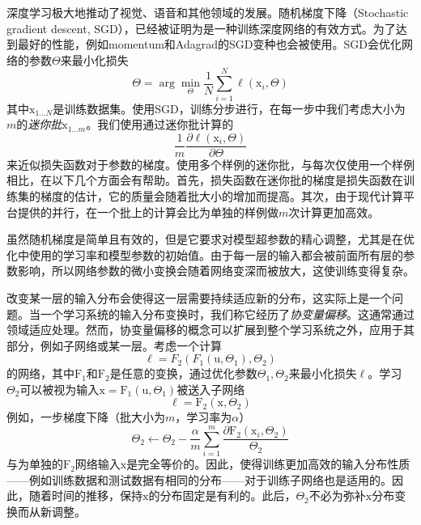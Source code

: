 \documentclass[../main.tex]{subfile}
\begin{document}
深度学习极大地推动了视觉、语音和其他领域的发展。随机梯度下降（Stochastic gradient descent, SGD），已经被证明为是一种训练深度网络的有效方式。为了达到最好的性能，例如momentum\cite{momentum}和Adagrad\cite{adagrad}的SGD变种也会被使用。SGD会优化网络的参数$\Theta$来最小化损失
\begin{equation*}
    \Theta = \arg\min_{\Theta} \frac{1}{N}\sum_{i=1}^{N}\ell(\text{x}_i, \Theta)
\end{equation*}
其中$\text{x}_{1\ldots N}$是训练数据集。使用SGD，训练分步进行，在每一步中我们考虑大小为$m$的\textit{迷你批}$\text{x}_{1\ldots m}$。我们使用通过迷你批计算的
\begin{equation*}
    \frac{1}{m} \frac{\partial \ell(\text{x}_i, \Theta)}{\partial \Theta}
\end{equation*}
来近似损失函数对于参数的梯度。使用多个样例的迷你批，与每次仅使用一个样例相比，在以下几个方面会有帮助。首先，损失函数在迷你批的梯度是损失函数在训练集的梯度的估计，它的质量会随着批大小的增加而提高。其次，由于现代计算平台提供的并行，在一个批上的计算会比为单独的样例做$m$次计算更加高效。

虽然随机梯度是简单且有效的，但是它要求对模型超参数的精心调整，尤其是在优化中使用的学习率和模型参数的初始值。由于每一层的输入都会被前面所有层的参数影响，所以网络参数的微小变换会随着网络变深而被放大，这使训练变得复杂。

改变某一层的输入分布会使得这一层需要持续适应新的分布，这实际上是一个问题。当一个学习系统的输入分布变换时，我们称它经历了\textit{协变量偏移}\cite{covariateshift}。这通常通过领域适应处理。然而，协变量偏移的概念可以扩展到整个学习系统之外，应用于其部分，例如子网络或某一层。考虑一个计算
\begin{equation*}
    \ell = F_2(F_1(\text{u}, \Theta_1), \Theta_2)
\end{equation*}
的网络，其中$\text{F}_1$和$\text{F}_2$是任意的变换，通过优化参数$\Theta_1,\Theta_2$来最小化损失$\ell$。学习$\Theta_2$可以被视为输入$\text{x}=\text{F}_1(\text{u}, \Theta_1)$被送入子网络
\begin{equation*}
    \ell = \text{F}_2(\text{x}, \Theta_2)
\end{equation*}
例如，一步梯度下降（批大小为$m$，学习率为$\alpha$）
\begin{equation*}
    \Theta_2 \leftarrow \Theta_2 - \frac{\alpha}{m}\sum_{i=1}^{m}\frac{\partial \text{F}_2\left(\text{x}_i, \Theta_2\right)}{\Theta_2}
\end{equation*}
与为单独的$\text{F}_2$网络输入$\text{x}$是完全等价的。因此，使得训练更加高效的输入分布性质——例如训练数据和测试数据有相同的分布——对于训练子网络也是适用的。因此，随着时间的推移，保持$\text{x}$的分布固定是有利的。此后，$\Theta_2$不必为弥补$\text{x}$分布变换而从新调整。
\end{document}
